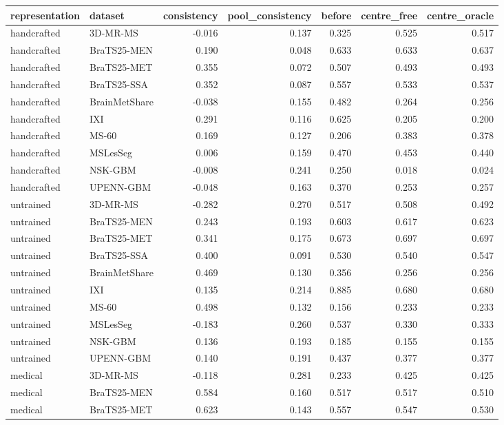 \begin{tabular}{llrrrrr}
\toprule
representation & dataset & consistency & pool\_consistency & before & centre\_free & centre\_oracle \\
\midrule
handcrafted & 3D-MR-MS & -0.016 & 0.137 & 0.325 & 0.525 & 0.517 \\
handcrafted & BraTS25-MEN & 0.190 & 0.048 & 0.633 & 0.633 & 0.637 \\
handcrafted & BraTS25-MET & 0.355 & 0.072 & 0.507 & 0.493 & 0.493 \\
handcrafted & BraTS25-SSA & 0.352 & 0.087 & 0.557 & 0.533 & 0.537 \\
handcrafted & BrainMetShare & -0.038 & 0.155 & 0.482 & 0.264 & 0.256 \\
handcrafted & IXI & 0.291 & 0.116 & 0.625 & 0.205 & 0.200 \\
handcrafted & MS-60 & 0.169 & 0.127 & 0.206 & 0.383 & 0.378 \\
handcrafted & MSLesSeg & 0.006 & 0.159 & 0.470 & 0.453 & 0.440 \\
handcrafted & NSK-GBM & -0.008 & 0.241 & 0.250 & 0.018 & 0.024 \\
handcrafted & UPENN-GBM & -0.048 & 0.163 & 0.370 & 0.253 & 0.257 \\
untrained & 3D-MR-MS & -0.282 & 0.270 & 0.517 & 0.508 & 0.492 \\
untrained & BraTS25-MEN & 0.243 & 0.193 & 0.603 & 0.617 & 0.623 \\
untrained & BraTS25-MET & 0.341 & 0.175 & 0.673 & 0.697 & 0.697 \\
untrained & BraTS25-SSA & 0.400 & 0.091 & 0.530 & 0.540 & 0.547 \\
untrained & BrainMetShare & 0.469 & 0.130 & 0.356 & 0.256 & 0.256 \\
untrained & IXI & 0.135 & 0.214 & 0.885 & 0.680 & 0.680 \\
untrained & MS-60 & 0.498 & 0.132 & 0.156 & 0.233 & 0.233 \\
untrained & MSLesSeg & -0.183 & 0.260 & 0.537 & 0.330 & 0.333 \\
untrained & NSK-GBM & 0.136 & 0.193 & 0.185 & 0.155 & 0.155 \\
untrained & UPENN-GBM & 0.140 & 0.191 & 0.437 & 0.377 & 0.377 \\
medical & 3D-MR-MS & -0.118 & 0.281 & 0.233 & 0.425 & 0.425 \\
medical & BraTS25-MEN & 0.584 & 0.160 & 0.517 & 0.517 & 0.510 \\
medical & BraTS25-MET & 0.623 & 0.143 & 0.557 & 0.547 & 0.530 \\

\end{tabular}
